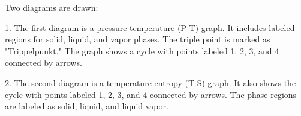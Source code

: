 Two diagrams are drawn:  

1. The first diagram is a pressure-temperature (P-T) graph. It includes labeled regions for solid, liquid, and vapor phases. The triple point is marked as "Trippelpunkt." The graph shows a cycle with points labeled 1, 2, 3, and 4 connected by arrows.  

2. The second diagram is a temperature-entropy (T-S) graph. It also shows the cycle with points labeled 1, 2, 3, and 4 connected by arrows. The phase regions are labeled as solid, liquid, and liquid vapor.
